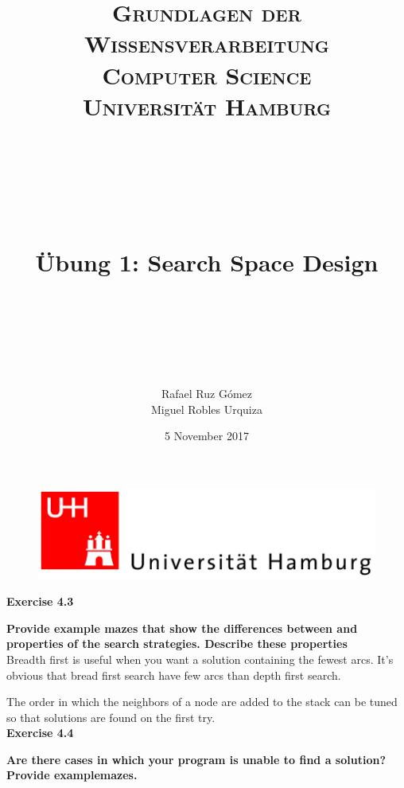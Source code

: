 \documentclass[paper=a4, fontsize=11pt]{scrartcl} %
\title{	
\normalfont \normalsize 
\textsc{\textbf{Grundlagen der Wissensverarbeitung} \\ Computer Science \\ Universität Hamburg} \\ [25pt] %
~\\
~\\
~\\
\horrule{0.5pt} \\[0.4cm] %
\Huge Übung 1: Search Space Design \\ %
\horrule{2pt} \\[0.5cm] %
~\\
~\\
}
\author{Rafael Ruz Gómez\\Miguel Robles Urquiza} %
\date{\normalsize 5 November 2017} %
\numberwithin{equation}{section} %
\numberwithin{figure}{section} %
\numberwithin{table}{section} %
\begin{document}
\maketitle %

\begin{figure}
	\centering
	\includegraphics[scale=0.8]{logo_uni_hamburg.png}
\end{figure}

\newpage %





\huge{ \textbf{Exercise 4.3}}
\newline

\large{\textbf{Provide example mazes that show the differences between and properties of the search strategies. Describe these properties}}\\

Breadth first is useful when you want a solution containing the fewest arcs. It's obvious that bread first search have few arcs than depth first search.


The order in which the neighbors of a node are added to the stack can be tuned so that solutions are found on the first try.\\





\huge{ \textbf{Exercise 4.4}}
\newline

\large{\textbf{Are there cases in which your program is unable to find a solution? Provide examplemazes.}}\\
\end{document}
